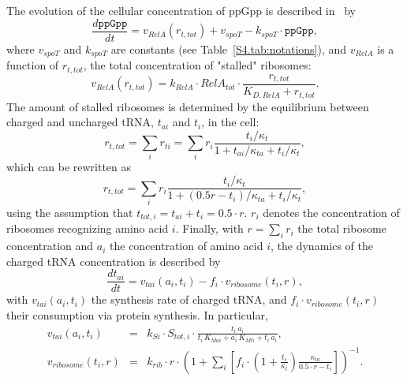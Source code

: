 The evolution of the cellular concentration of ppGpp is described in~\cite{bosdriesz_how_2015} by
\begin{equation}
\label{eq:ppGpp}
\frac{d\texttt{ppGpp}}{dt} = v_{RelA}(r_{t,tot}) + v_{spoT} - k_{spoT} \cdot \texttt{ppGpp},
\end{equation}
where $v_{spoT}$ and $k_{spoT}$ are constants (see Table~\ref{S4.tab:notations}), and $v_{RelA}$ is a function of $r_{t,tot}$, the total concentration of "stalled" ribosomes:
\begin{equation}
\label{eq:vrelA}
v_{RelA}(r_{t,tot}) = k_{RelA} \cdot RelA_{tot} \cdot \frac{r_{t,tot}}{K_{D,RelA} + r_{t,tot}}.
\end{equation}
The amount of stalled ribosomes is determined by the equilibrium between charged and uncharged tRNA, $t_{ai}$ and $t_{i}$, in the cell:
\begin{equation}
\label{eq:rttot}
r_{t,tot} = \sum_i r_{ti} = \sum_i r_i \frac{t_i/\kappa_{t}}{1+t_{ai}/\kappa_{ta}+t_i/\kappa_{t}},
\end{equation}
which can be rewritten as
\begin{equation}
\label{eq:rttot-f}
r_{t,tot} = \sum_i r_i \frac{t_i/\kappa_{t}}{1+(0.5 r-t_i)/\kappa_{ta}+t_i/\kappa_{t}},
\end{equation}
using the assumption that $t_{tot,i}  = t_{ai} + t_i = 0.5 \cdot r$.
$r_i$ denotes the concentration of ribosomes recognizing amino acid  $i$.
Finally, with $r = \sum_i r_i$ the total ribosome concentration and $a_i$ the concentration of amino acid $i$, the dynamics of the charged tRNA concentration is described by
\begin{equation}
\label{eq:ti_dynamic}
\frac{dt_{ai}}{dt} = v_{tai}(a_i, t_{i}) - f_i \cdot v_{ribosome}(t_i,r),
\end{equation}
with $v_{tai}(a_i, t_{i})$ the synthesis rate of charged tRNA, and $f_i \cdot v_{ribosome}(t_i,r)$ their consumption via protein synthesis.
In particular,
\begin{eqnarray}
v_{tai}(a_i, t_{i}) &=& k_{Si} \cdot S_{tot,i} \cdot \frac{t_i\, a_i}{t_i\,  K_{Mai} + a_i\,  K_{Mti} + t_i\,  a_i}, \label{eq:vtai}\\
v_{ribosome}(t_i, r) &=& k_{rib} \cdot r \cdot \left(1+ \sum_i \left[ f_i \cdot \left( 1 + \frac{t_i}{\kappa_t} \right) \frac{\kappa_{ta}}{0.5\cdot r - t_i} \right]\right)^{-1}. \label{eq:vrib}
\end{eqnarray}

